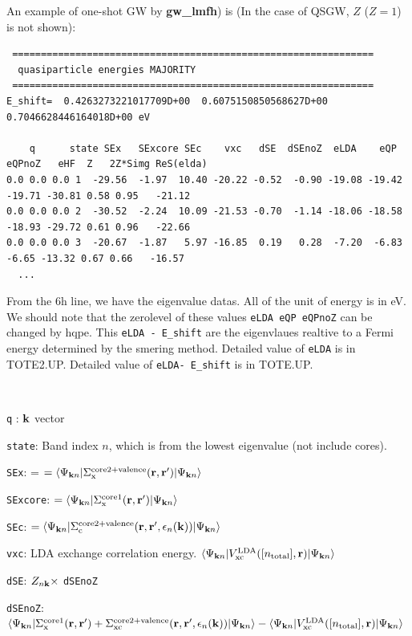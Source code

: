 \documentclass[a4paper,10pt,epsf,fleqn]{article}
\newcommand{\exe}[1]{{\bf #1}}
\begin{document}
{An example of one-shot GW by \exe{gw\_lmfh}) is 
(In the case of QSGW, $Z$ ($Z=1$) is not shown):
{\baselineskip=2.6mm \small
\begin{verbatim} 
 ===============================================================
  quasiparticle energies MAJORITY
 ===============================================================
E_shift=  0.4263273221017709D+00  0.6075150850568627D+00  0.7046628446164018D+00 eV

    q      state SEx   SExcore SEc    vxc   dSE  dSEnoZ  eLDA    eQP  eQPnoZ   eHF  Z   2Z*Simg ReS(elda)
0.0 0.0 0.0 1  -29.56  -1.97  10.40 -20.22 -0.52  -0.90 -19.08 -19.42 -19.71 -30.81 0.58 0.95   -21.12
0.0 0.0 0.0 2  -30.52  -2.24  10.09 -21.53 -0.70  -1.14 -18.06 -18.58 -18.93 -29.72 0.61 0.96   -22.66
0.0 0.0 0.0 3  -20.67  -1.87   5.97 -16.85  0.19   0.28  -7.20  -6.83  -6.65 -13.32 0.67 0.66   -16.57
  ...
\end{verbatim}}
From the 6h line, we have the eigenvalue datas. All of the unit of energy is in eV.
We should note that the zerolevel of these values {\tt eLDA  eQP eQPnoZ} can be changed  by hqpe.
This {\tt eLDA - E\_shift} are the eigenvlaues realtive to a Fermi energy determined by the smering method.
Detailed value of {\tt eLDA} is in {\sf TOTE2.UP}.
Detailed value of {\tt eLDA- E\_shift} is in {\sf TOTE.UP}.

\ 

{\tt q}  : ${\bf k}$ vector

{\tt state}: Band index $n$, which is from the lowest eigenvalue (not include cores).

{\tt SEx}: = $= \langle\Psi_{{\bf k}n}|\Sigma_{\rm x}^{\rm core2+valence}({\bf r},{\bf r}^{\prime})|\Psi_{{\bf k}n}\rangle$

{\tt SExcore}: $= \langle\Psi_{{\bf k}n}|\Sigma_{\rm x}^{\rm core1}({\bf r},{\bf r}^{\prime})|\Psi_{{\bf k}n}\rangle$

{\tt SEc}: $ = \langle\Psi_{{\bf k}n}|\Sigma_{\rm c}^{\rm core2+valence}({\bf r},{\bf r}^{\prime},\epsilon_n({\bf k}))|\Psi_{{\bf k}n}\rangle$

{\tt vxc}: LDA exchange correlation energy.
$\langle\Psi_{{\bf k}n}|V_{\rm xc}^{\rm LDA}([n_{\rm total}],{\bf r})|\Psi_{{\bf k}n}\rangle$

{\tt dSE}: $Z_{n{\bf k}}\times$ {\tt dSEnoZ}

{\tt dSEnoZ}: $
\langle\Psi_{{\bf k}n}|
\Sigma_{\rm x}^{\rm core1}({\bf r},{\bf r}^{\prime})+
\Sigma_{\rm xc}^{\rm core2+valence}({\bf r},{\bf r}^{\prime},\epsilon_n({\bf k}))
|\Psi_{{\bf k}n}\rangle 
- \langle\Psi_{{\bf k}n}|V_{\rm xc}^{\rm LDA}([n_{\rm total}],{\bf r})|\Psi_{{\bf k}n}\rangle$

}
\end{document}
